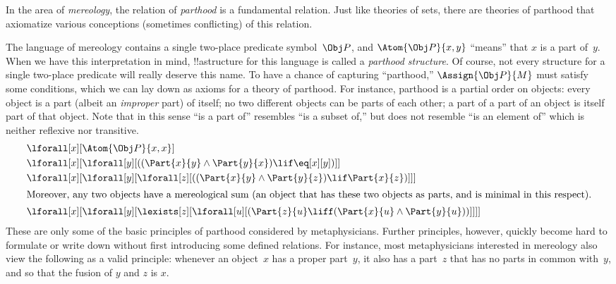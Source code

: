 \documentclass[../../../include/open-logic-section]{subfiles}
\begin{document}
\begin{ex}
In the area of \emph{mereology}, the relation of \emph{parthood} is a
fundamental relation.  Just like theories of sets, there are theories
of parthood that axiomatize various conceptions (sometimes
conflicting) of this relation.

The language of mereology contains a single two-place predicate
symbol~$\Obj P$, and $\Atom{\Obj P}{x, y}$ ``means'' that $x$ is a
part of~$y$.  When we have this interpretation in mind, !!a{structure}
for this language is called a \emph{parthood structure}.  Of course,
not every structure for a single two-place predicate will really
deserve this name.  To have a chance of capturing ``parthood,''
$\Assign{\Obj P}{M}$ must satisfy some conditions, which we can lay
down as axioms for a theory of parthood.  For instance, parthood is a
partial order on objects: every object is a part (albeit an
\emph{improper} part) of itself; no two different objects can be parts
of each other; a part of a part of an object is itself part of that
object.  Note that in this sense ``is a part of'' resembles ``is a
subset of,'' but does not resemble ``is an element of'' which is
neither reflexive nor transitive.
\begin{align*}
& \lforall[x][\Atom{\Obj P}{x,x}] \\
& \lforall[x][\lforall[y][((\Part{x}{y} \land \Part{y}{x})
      \lif \eq[x][y])]] \\
& \lforall[x][\lforall[y][\lforall[z][((\Part{x}{y} \land
        \Part{y}{z}) \lif \Part{x}{z})]]]\\
\intertext{Moreover, any two objects have a mereological sum (an object that has
  these two objects as parts, and is minimal in this respect).}  &
\lforall[x][\lforall[y][\lexists[z][\lforall[u][(\Part{z}{u} \liff
        (\Part{x}{u} \land \Part{y}{u}))]]]]
\end{align*}
These are only some of the basic principles of parthood considered by
metaphysicians.  Further principles, however, quickly become hard to
formulate or write down without first introducing some defined
relations.  For instance, most metaphysicians interested in mereology
also view the following as a valid principle: whenever an
object~$x$ has a proper part~$y$, it also has a part~$z$ that has no
parts in common with~$y$, and so that the fusion of $y$ and $z$ is
$x$.
\end{ex}
\end{document}
